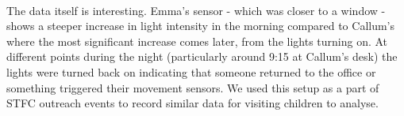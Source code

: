 \paragraph{}
The data itself is interesting. Emma's sensor - which was closer to a window - shows a steeper increase in light intensity in the morning compared to Callum's where the most significant increase comes later, from the lights turning on. At different points during the night (particularly around 9:15 at Callum's desk) the lights were turned back on indicating that someone returned to the office or something triggered their movement sensors. We used this setup as a part of STFC outreach events to record similar data for visiting children to analyse.

